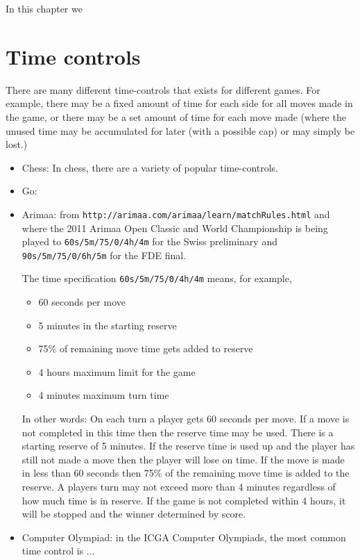 \documentclass[10pt,dvipdfmx,letterpaper]{report}
\begin{document}
In this chapter we 

\section{Time controls}
There are many different time-controls that exists for different games.
For example, there may be a fixed amount of time for each side for all moves
made in the game, or there may be a set amount of time for each move made (where
the unused time may be accumulated for later (with a possible cap) or may simply
be lost.)

\begin{itemize}
\item Chess: In chess, there are a variety of popular time-controls.
\item Go:
\item Arimaa: from {\tt http://arimaa.com/arimaa/learn/matchRules.html}
and where the 2011 Arimaa Open Classic and World Championship
is being played to {\tt 60s/5m/75/0/4h/4m} for the Swiss preliminary and
{\tt 90s/5m/75/0/6h/5m} for the FDE final.

The time specification {\tt 60s/5m/75/0/4h/4m} means, for example,
  \begin{itemize}
  \item 60 seconds per move
  \item 5 minutes in the starting reserve
  \item 75\% of remaining move time gets added to reserve
  \item 4 hours maximum limit for the game
  \item 4 minutes maximum turn time 
  \end{itemize}
In other words:
On each turn a player gets 60 seconds per move.
If a move is not completed in this time then the reserve time may be used.
There is a starting reserve of 5 minutes.
If the reserve time is used up and the player has still not made a move then the player will lose on time.
If the move is made in less than 60 seconds then 75\% of the remaining move time is added to the reserve.
A players turn may not exceed more than 4 minutes regardless of how much time is in reserve.
If the game is not completed within 4 hours, it will be stopped and the winner determined by score.
\item Computer Olympiad: in the ICGA Computer Olympiads, the most common time control is ...
\end{itemize}
\end{document}
